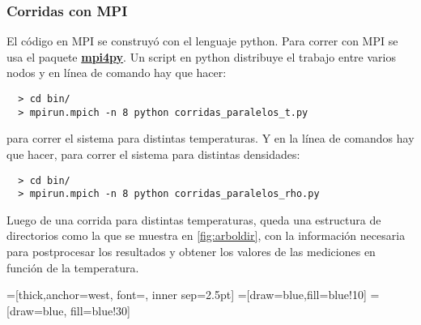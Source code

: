 \subsubsection{Corridas con MPI}

El código en MPI se construyó con el lenguaje python. Para correr con MPI se usa 
el paquete \href{http://mpi4py.scipy.org/} {\textbf{mpi4py}}.
Un script en python distribuye el trabajo entre varios nodos  y en línea de comando
hay que hacer:

\begin{verbatim}
  > cd bin/
  > mpirun.mpich -n 8 python corridas_paralelos_t.py
\end{verbatim}

para correr el sistema para distintas temperaturas. Y en la línea
de comandos hay que hacer, para correr el sistema para distintas densidades:

\begin{verbatim}
  > cd bin/
  > mpirun.mpich -n 8 python corridas_paralelos_rho.py
\end{verbatim}



Luego de una corrida para distintas  temperaturas, queda una estructura de directorios
como la que se muestra en \eqref{fig:arboldir}, con la información necesaria 
para postprocesar
los resultados y obtener los valores de las mediciones en función de la temperatura.




=[thick,anchor=west, 
font={\scriptsize\ttfamily}, inner sep=2.5pt]
=[draw=blue,fill=blue!10]
=[draw=blue, fill=blue!30]

